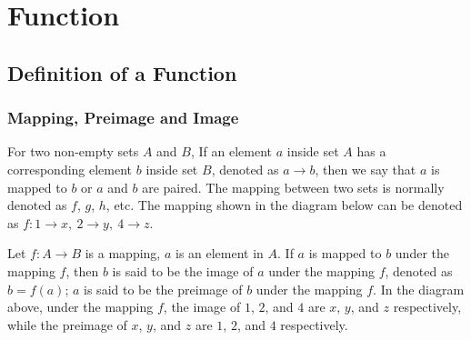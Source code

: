 \documentclass[12pt]{report}
\begin{document}

\chapter{Function}

\section{Definition of a Function}
\subsection*{Mapping, Preimage and Image}

\begin{multicols}{2}

  For two non-empty sets $A$ and $B$, If an element $a$ inside set $A$ has a
  corresponding element $b$ inside set $B$, denoted as $a \to b$, then we say
  that $a$ is mapped to $b$ or $a$ and $b$ are paired. The mapping between two
  sets is normally denoted as $f$, $g$, $h$, etc. The mapping shown in the
  diagram below can be denoted as $f:1 \to x,\ 2 \to y,\ 4 \to z$.
  \begin{center}
  \end{center}
\end{multicols}

Let $f:A \to B$ is a mapping, $a$ is an element in $A$. If $a$ is mapped to $b$
under the mapping $f$, then $b$ is said to be the image of $a$ under the
mapping $f$, denoted as $b = f(a)$; $a$ is said to be the preimage of $b$ under
the mapping $f$. In the diagram above, under the mapping $f$, the image of $1$,
$2$, and $4$ are $x$, $y$, and $z$ respectively, while the preimage of $x$,
$y$, and $z$ are $1$, $2$, and $4$ respectively.
\end{document}
